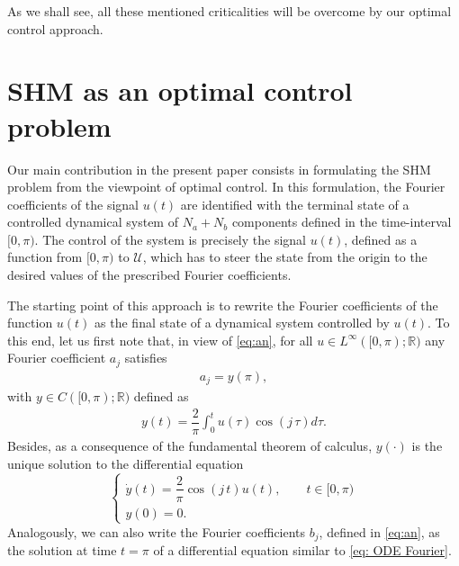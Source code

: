 \documentclass[twocolumn]{autart}    %
\begin{document}
%
% 
As we shall see, all these mentioned criticalities will be overcome by our optimal control approach.

\section{SHM as an optimal control problem}\label{sec:Contributions}

Our main contribution in the present paper consists in formulating the SHM problem from the viewpoint of optimal control. In this formulation, the Fourier coefficients of the signal $u(t)$ are identified with the terminal state of a controlled dynamical system of $N_a+N_b$ components defined in the time-interval $[0,\pi)$.  The control of the system is precisely the signal $u(t)$, defined as a function from $[0,\pi)$ to $\mathcal{U}$, which has to steer the state from the origin to the desired values of the prescribed Fourier coefficients. 

The starting point of this approach is to rewrite the Fourier coefficients of the function $u(t)$ as the final state of a dynamical system controlled by $u(t)$. To this end, let us first note that, in view of \eqref{eq:an}, for all $u\in L^\infty ([0,\pi);\mathbb{R})$ any Fourier coefficient $a_j$ satisfies
\begin{align*}
	a_j = y(\pi), 
\end{align*}
with $y\in C([0,\pi);\mathbb{R})$ defined as
\begin{align*}
	y(t) = \dfrac{2}{\pi} \int_0^t u(\tau) \cos(j\, \tau) d\tau.
\end{align*}
Besides, as a consequence of the fundamental theorem of calculus, $y(\cdot)$ is the unique solution to the differential equation
\begin{equation}\label{eq: ODE Fourier}
	\begin{cases}
		\dot{y} (t) = \dfrac{2}{\pi} \cos(j\, t) u(t), \qquad  t\in [0,\pi)
		\\[5pt]
		y(0) = 0.
	\end{cases}
\end{equation}
Analogously, we can also write the Fourier coefficients $b_j$, defined in \eqref{eq:an}, as the solution at time $t=\pi$ of a differential equation similar to \eqref{eq: ODE Fourier}.
\end{document}
